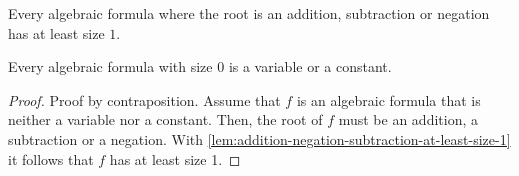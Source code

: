 \begin{lemma}\label{lem:addition-negation-subtraction-at-least-size-1}
  Every algebraic formula where the root is an addition, subtraction or
  negation has at least size $1$.
\end{lemma}

\begin{lemma}
  Every algebraic formula with size $0$ is a variable or a constant.
\end{lemma}

\begin{proof}
  Proof by contraposition. Assume that $f$ is an algebraic formula that
  is neither a variable nor a constant. Then, the root of $f$ must be an
  addition, a subtraction or a negation. With
  \ref{lem:addition-negation-subtraction-at-least-size-1} it follows
  that $f$ has at least size 1.
\end{proof}